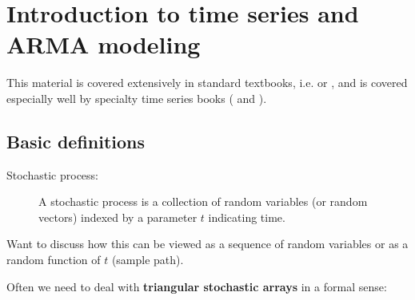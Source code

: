 

\section{Introduction to time series and ARMA modeling}

This material is covered extensively in standard textbooks,
i.e. \citet{Ha00} or \citet{Gr12}, and is covered especially well by
specialty time series books (\citealp{BD91} and \citealp{Ha94}).

\subsection{Basic definitions}

\begin{description}
\item[Stochastic process:]
A stochastic process is a collection of random variables (or
random vectors) indexed by a parameter $t$ indicating time.
\end{description}

Want to discuss how this can be viewed as a sequence of random
variables or as a random function of $t$ (sample path).

Often we need to deal with \textbf{triangular stochastic arrays} in a
formal sense:

